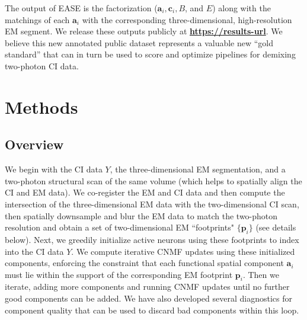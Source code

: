 \documentclass[10pt,letterpaper]{article}
\def \resultURL{https://results-url}
\begin{document}



The output of EASE is the factorization ($\bm{a}_i, \bm{c}_i, B$, and $E$) along with the matchings of each $\bm{a}_i$ with the corresponding three-dimensional, high-resolution EM segment.  We release these outputs publicly at  \href{\resultURL}{\bf\resultURL}. We believe this new annotated public dataset represents a valuable new ``gold standard'' that can in turn be used to score and optimize pipelines for demixing two-photon CI data.  


\section{Methods}

\subsection{Overview}
We begin with the CI data $Y$, the three-dimensional EM segmentation,  and a two-photon structural scan of the same volume (which helps to spatially align the CI and EM data).  We co-register the EM and CI data and then compute the intersection of the three-dimensional EM data with the two-dimensional CI scan, then spatially downsample and blur the EM data to match the two-photon resolution and obtain a set of two-dimensional EM ``footprints" $\{\bm{p}_i\}$ (see details below). Next, we greedily initialize active neurons using these footprints to index into the CI data $Y$.  We compute iterative CNMF updates using these initialized components, enforcing the constraint that each functional spatial component $\bm{a}_i$ must lie within the support of the corresponding EM footprint $\bm{p}_i$.  Then we iterate, adding more components and running CNMF updates until no further good components can be added.  We have also developed several diagnostics for component quality that can be used to discard bad components within this loop.
\end{document}
